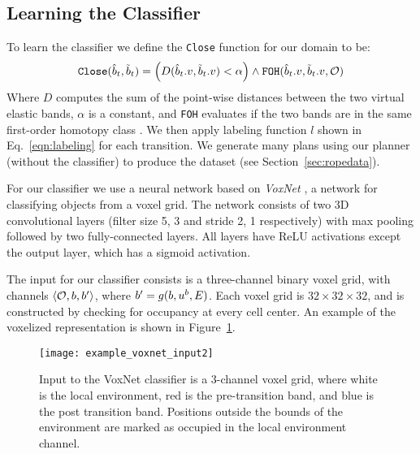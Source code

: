 \subsection{Learning the Classifier}

To learn the classifier we define the \texttt{Close} function for our domain to be:
$$
\texttt{Close}(\hat {b}_t, \tilde {b}_t) = \left( D(\hat {b}_t.v, \tilde {b}_t.v) < \alpha \right) \land \texttt{FOH}(\hat {b}_t.v, \tilde {b}_t.v,\mathcal{O})
$$
\noindent Where $D$ computes the sum of the point-wise distances between the two virtual elastic bands, $\alpha$ is a constant, and \texttt{FOH} evaluates if the two bands are in the same first-order homotopy class \cite{Jaillet2008}. We then apply labeling function $l$ shown in Eq.~\eqref{eqn:labeling} for each transition. We generate many plans using our planner (without the classifier) to produce the dataset (see Section~\ref{sec:ropedata}).

For our classifier we use a neural network based on \textit{VoxNet} \cite{Maturana2015VoxNet}, a network for classifying objects from a voxel grid. The network consists of two 3D convolutional layers (filter size 5, 3 and stride 2, 1 respectively) with max pooling followed by two fully-connected layers. All layers have ReLU activations except the output layer, which has a sigmoid activation.

The input for our classifier consists is a three-channel binary voxel grid, with channels  $\left<\mathcal{O}, b, b'\right>$, where $b' = g(b, u^b, E)$. Each voxel grid is $32\times32\times32$, and is constructed by checking for occupancy at every cell center. An example of the voxelized representation is shown in Figure~\ref{fig:VoxNet_input}.

\begin{figure}[h]
    \centering
    \texttt{[image: example\_voxnet\_input2]}
    \caption{Input to the VoxNet classifier is a 3-channel voxel grid, where white is the local environment, red is the pre-transition band, and blue is the post transition band. Positions outside the bounds of the environment are marked as occupied in the local environment channel.}
    \label{fig:VoxNet_input}
\end{figure}


